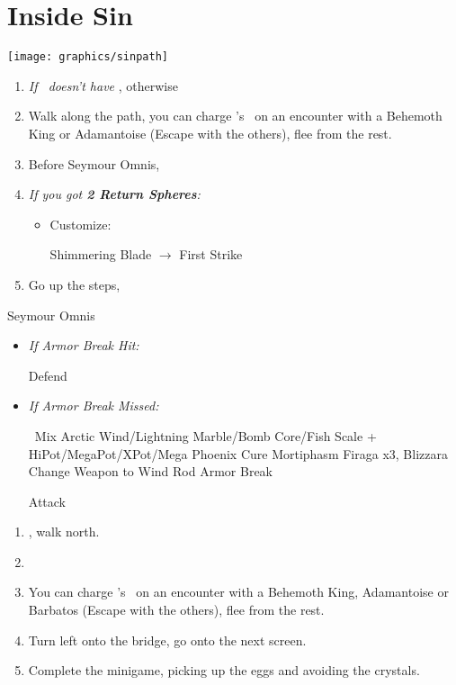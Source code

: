 \chapter{Inside Sin}
\texttt{[image: graphics/sinpath]}
\begin{enumerate}
    \item \textit{If \rikku\ doesn't have \od} \formation{\tidus}{\auron}{\rikku}, otherwise \formation{\tidus}{\auron}{\kimahri}
    \item Walk along the path, you can charge \rikku's \od\ on an encounter with a Behemoth King or Adamantoise (Escape with the others), flee from the rest.
    \item Before Seymour Omnis, \formation{\tidus}{\auron}{\yuna}
    \item \textit{If you got \textbf{2 Return Spheres}:}
    \begin{itemize}
        \item Customize:
        \begin{itemize}
            \auronf Shimmering Blade $\rightarrow$ First Strike
        \end{itemize}
    \end{itemize}
    \item Go up the steps, \sd
\end{enumerate}
\begin{battle}[80000]{Seymour Omnis}
    \begin{itemize}
        \yunaf Defend
        \tidusf Armor Break
        \item \textit{If Armor Break Hit:}
        \begin{itemize}
            \auronf Defend
        \end{itemize}
        \item \textit{If Armor Break Missed:}
        \begin{itemize}
            \switch{\auron}{\rikku}
            \rikkuf \od\ Mix Arctic Wind/Lightning Marble/Bomb Core/Fish Scale + HiPot/MegaPot/XPot/Mega Phoenix
            \yunaf Cure Mortiphasm
            \enemyf Firaga x3, Blizzara
            \yunaf Change Weapon to Wind Rod
            \tidusf Armor Break
        \end{itemize}
        \summon{\bahamut}
        \bahamutf Attack
    \end{itemize}
\end{battle}
\begin{enumerate}[resume]
    \item \sd, walk north.
    \item \formation{\tidus}{\kimahri}{\auron}
    \item You can charge \rikku's \od\ on an encounter with a Behemoth King, Adamantoise or Barbatos (Escape with the others), flee from the rest.
    \item Turn left onto the bridge, go onto the next screen.
    \item Complete the minigame, picking up the eggs and avoiding the crystals.
\end{enumerate}
